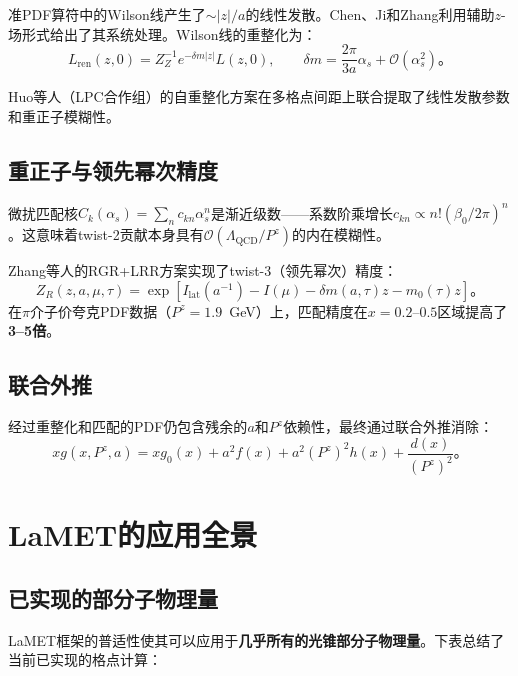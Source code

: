 \documentclass[12pt,a4paper]{ctexart}
\theoremstyle{definition}
\begin{document}
准PDF算符中的Wilson线产生了$\sim |z|/a$的线性发散。Chen、Ji和Zhang\cite{Chen2016improved}利用辅助$z$-场形式给出了其系统处理。Wilson线的重整化为：
\begin{equation}
L_{\text{ren}}(z,0) = Z^{-1}_Z e^{-\delta m|z|} L(z,0), \qquad \delta m = \frac{2\pi}{3a}\alpha_s + \mathcal{O}(\alpha_s^2)。
\end{equation}

Huo等人（LPC合作组）\cite{Huo2021self}的自重整化方案在多格点间距上联合提取了线性发散参数和重正子模糊性。

\subsection{重正子与领先幂次精度}

微扰匹配核$C_k(\alpha_s) = \sum_n c_{kn}\alpha_s^n$是渐近级数——系数阶乘增长$c_{kn} \propto n!(\beta_0/2\pi)^n$。这意味着twist-2贡献本身具有$\mathcal{O}(\Lambda_{\text{QCD}}/P^z)$的内在模糊性\cite{Zhang2023RGR,Su2023LRR}。

Zhang等人\cite{Zhang2023RGR}的RGR+LRR方案实现了twist-3（领先幂次）精度：
\begin{equation}
Z_R(z, a, \mu, \tau) = \exp[I_{\text{lat}}(a^{-1}) - I(\mu) - \delta m(a,\tau)z - m_0(\tau)z]。
\end{equation}
在$\pi$介子价夸克PDF数据（$P^z=1.9$~GeV）上，匹配精度在$x=0.2\text{--}0.5$区域提高了\textbf{3--5倍}。

\subsection{联合外推}

经过重整化和匹配的PDF仍包含残余的$a$和$P^z$依赖性，最终通过联合外推消除\cite{Chen2025gluon}：
\begin{equation}
xg(x, P^z, a) = xg_0(x) + a^2 f(x) + a^2 (P^z)^2 h(x) + \frac{d(x)}{(P^z)^2}。
\end{equation}

\section{LaMET的应用全景}

\subsection{已实现的部分子物理量}

LaMET框架的普适性使其可以应用于\textbf{几乎所有的光锥部分子物理量}\cite{Ji2013Euclidean,Ji2014LaMET}。下表总结了当前已实现的格点计算：
\end{document}
